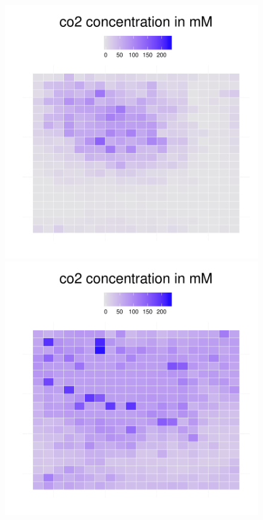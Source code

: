 \begin{figure}[h!]
{\begin{minipage}[t]{0.3\textwidth}
  \end{minipage}
  \begin{minipage}[t]{0.3\textwidth}
    \includegraphics[width=\textwidth]{../results/beijerinckii_20x20_seed943_co230.pdf}
  \end{minipage}
  \begin{minipage}[t]{0.3\textwidth}
    \includegraphics[width=\textwidth]{../results/beijerinckii_20x20_seed943_co245.pdf}

\end{minipage}}
\end{figure}
